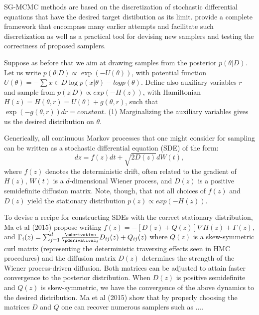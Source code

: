 SG-MCMC methods are based on the discretization of 
stochastic differential equations that have the desired target 
distibution as its limit. \cite{ma2015complete} provide a
complete framework that encompass many earlier attempts and
facilitate such discretization as well as a practical tool for
devising new samplers and testing the correctness of proposed samplers.

Suppose as before that we aim at drawing samples from the
posterior $p(\theta |D)$. 
Let us write $p(\theta |D) \propto \exp(−U(\theta ))$,
with potential function
$U(\theta ) = −\sum {x\in D} \log p(x|\theta ) − log p(\theta )$. Define also auxiliary variables $r$ and sample from $p(z|D) \propto  exp(−H(z))$, with Hamiltonian
$H(z) = H(\theta , r) = U(\theta ) + g(\theta , r)$, such that
$\exp(−g(\theta , r))dr = constant$. (1)
Marginalizing the auxiliary variables gives us the desired distribution on $\theta $.

Generically, all continuous Markov processes that one might consider for sampling can be written
as a stochastic differential equation (SDE) of the form:
\begin{equation}
dz = f(z)dt +
\sqrt{ 2D(z)}dW(t),
\end{equation}
where $f(z)$ denotes the deterministic drift, often related to the gradient of $H(z)$, $W(t)$  is a $d$-dimensional Wiener process, and 
$D(z)$ is a positive semidefinite diffusion matrix. Note, though,
that not all choices of $f(z)$ and $D(z)$ yield the stationary distribution $p(z) \propto  exp(−H(z))$.

To devise a recipe for constructing SDEs with the correct stationary distribution, Ma et al (2015) propose 
writing
$f(z) = − [D(z) + Q(z)] \nabla H(z) + \Gamma (z)$, 
and $\Gamma _i (z) = \sum _{j=1}^d 
\frac{\pderivative}{\pderivative z_j}
D_{ij} (z) + Q_{ij} (z)$
where $ Q(z)$ is a skew-symmetric curl matrix (representing the deterministic traversing effects seen
in HMC procedures) and the diffusion matrix $D(z)$
determines the strength of the Wiener process-driven diffusion.
Both matrices can be adjusted to attain faster convergence to
the posterior distribution. When 
$D(z)$ is positive semidefinite and $Q(z)$ is skew-symmetric, we
have the convergence of the above dynamics to the desired 
distribution. Ma et al (2015) show that by properly choosing
the matrices  $D$  and $Q$ one can recover numerous samplers such
as ....

